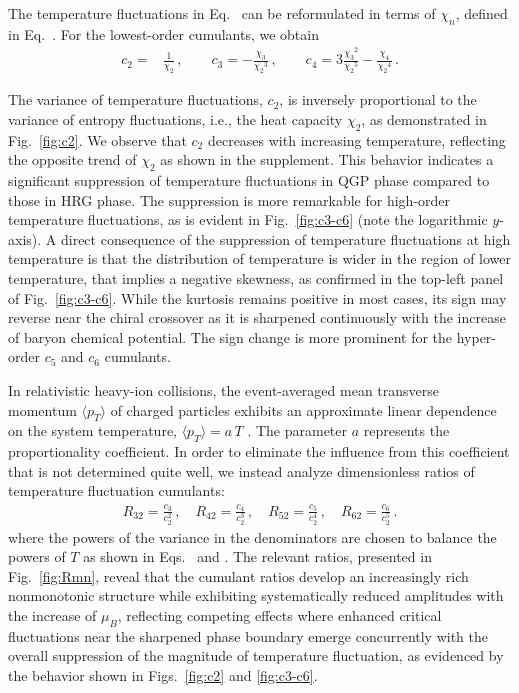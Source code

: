 \documentclass[aps,twocolumn,
prl,
superscriptaddress,nofootinbib,floatfix]{revtex4-2}
\begin{document}
The temperature fluctuations in Eq.~ can be reformulated in terms of $\chi_n$, defined in Eq.~. For the lowest-order cumulants, we obtain
\begin{align}
    c_2=&\frac{1}{\chi_2}\,, \qquad c_3=-\frac{\chi_3}{{\chi_2}^3}\,, \qquad c_4=3\frac{{\chi_3}^2}{{\chi_2}^5}-\frac{\chi_4}{{\chi_2}^4}\,. \label{}
\end{align}

The variance of temperature fluctuations, $c_2$, is inversely proportional to the variance of entropy fluctuations, i.e., the heat capacity $\chi_2$, as demonstrated in Fig.~\ref{fig:c2}. We observe that $c_2$ decreases with increasing temperature, reflecting the opposite trend of $\chi_2$ as shown in the supplement. This behavior indicates a significant suppression of temperature fluctuations in QGP phase compared to those in HRG phase. The suppression is more remarkable for high-order temperature fluctuations, as is evident in Fig.~\ref{fig:c3-c6} 
(note the logarithmic $y$-axis). A direct consequence of the suppression of temperature fluctuations at high temperature is that the distribution of temperature is wider in the region of lower temperature, that implies a negative skewness, as confirmed in the top-left panel of Fig.~\ref{fig:c3-c6}. While the kurtosis remains positive in most cases, its sign may reverse near the chiral crossover as it is sharpened continuously with the increase of baryon chemical potential. The sign change is more prominent for the hyper-order $c_5$ and $c_6$ cumulants.

In relativistic heavy-ion collisions, the event-averaged mean transverse momentum $\langle p_{T} \rangle$ of charged particles exhibits an approximate linear dependence on the system temperature, $\langle p_{T} \rangle = a\,T$ \cite{Gardim:2019xjs, Gardim:2019brr, Giacalone:2020lbm, Gardim:2024zvi}. The parameter $a$ represents the proportionality coefficient. In order to eliminate the influence from this coefficient that is not determined quite well, we instead analyze dimensionless ratios of temperature fluctuation cumulants: 
\begin{align}
    R_{32}=\frac{c_3}{c_2^2}\,, \quad R_{42}=\frac{c_4}{c_2^3}\,,\quad R_{52}=\frac{c_5}{c_2^4}\,,\quad R_{62}=\frac{c_6}{c_2^5}\,.\label{eq:R32R42}
\end{align}
where the powers of the variance in the denominators are chosen to balance the powers of $T$ as shown in Eqs.~ and . The relevant ratios, presented in Fig.~\ref{fig:Rmn}, reveal that the cumulant ratios develop an increasingly rich nonmonotonic structure while exhibiting systematically reduced amplitudes with the increase of $\mu_B$, reflecting competing effects where enhanced critical fluctuations near the sharpened phase boundary emerge concurrently with the overall suppression of the magnitude of temperature fluctuation, as evidenced by the behavior shown in Figs.~\ref{fig:c2} and \ref{fig:c3-c6}. 
\end{document}
